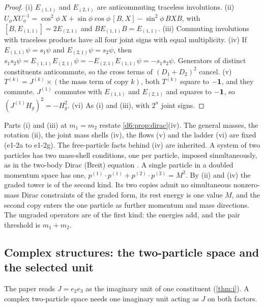 \begin{proof}
(i) $E_{(1,1)}$ and $E_{(2,1)}$ are anticommuting traceless involutions. (ii) $U_\phi XU_\phi^{-1}=\cos^2\!\phi\,X+\sin\phi\cos\phi\,[B,X]-\sin^2\!\phi\,BXB$, with
$[B,E_{(1,1)}]=2E_{(2,1)}$ and $BE_{(1,1)}B=E_{(1,1)}$. (iii) Commuting involutions with traceless products have all four joint signs with equal
multiplicity. (iv) If $E_{(1,1)}\psi=s_1\psi$ and $E_{(2,1)}\psi=s_2\psi$, then $s_1s_2\psi=E_{(1,1)}E_{(2,1)}\psi=-E_{(2,1)}E_{(1,1)}\psi=-s_1s_2\psi$. Generators of
distinct constituents anticommute, so the cross terms of $(D_1+D_2)^2$ cancel. (v) $T^{(k)}=J^{(k)}\times(\text{the mass term of copy }k)$, both
$T^{(k)}$ square to $-\mathbf 1$, and they commute. $J^{(1)}$ commutes with $E_{(1,1)}$ and $E_{(2,1)}$ and squares to $-\mathbf 1$, so
$(J^{(1)}H_g)^2=-H_g^2$. (vi) As (i) and (iii), with $2^n$ joint signs.
\end{proof}

Parts (i) and (iii) at $m_1=m_2$ restate \cref{d6:prop:dirac}(iv). The general masses, the rotation (ii), the joint mass shells
(iv), the flows (v) and the ladder (vi) are fixed (e1-2a to e1-2g). The free-particle facts behind (iv) are inherited. A system of two
particles has two mass-shell conditions, one per particle, imposed simultaneously, as in the two-body Dirac (Breit) equation
\cite{Breit29}. A single particle in a doubled momentum space has one, $p^{(1)}\cdot p^{(1)}+p^{(2)}\cdot p^{(2)}=M^2$. By (ii) and (iv)
the graded tower is of the second kind. Its two copies admit no simultaneous nonzero-mass Dirac constraints of the graded form, its rest energy is one value $M$, and the second copy
enters the one particle as further momentum and mass directions. The ungraded operators are of the first kind: the energies add, and
the pair threshold is $m_1+m_2$.

\subsection{Complex structures: the two-particle space and the selected unit}
\label{e1:sec:complex}

The paper reads $J=e_2e_3$ as the imaginary unit of one constituent (\cref{thm:i}). A complex two-particle space needs one
imaginary unit acting as $J$ on both factors.

